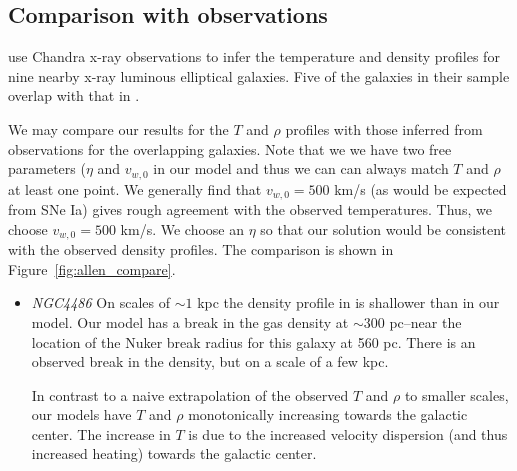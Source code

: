 \documentclass[usenatbib,fleqn]{mn2e}
\newcommand{\vwO}{v_{w,0}}
\begin{document}

\subsection{Comparison with observations}
\citealt{AllenDunn+:2006a} use Chandra x-ray observations to infer the
temperature and density profiles for nine nearby x-ray luminous
elliptical galaxies.  Five of the galaxies in their sample overlap
with that in .

We may compare our results for the $T$ and $\rho$ profiles with those
inferred from observations for the overlapping galaxies.  Note that we
we have two free parameters ($\eta$ and $\vwO$ in our model and thus
we can can always match $T$ and $\rho$ at least one point.  We
generally find that $\vwO=500$ km/s (as would be expected from SNe Ia)
gives rough agreement with the observed temperatures.  Thus, we choose
$\vwO=500$ km/s.  We choose an $\eta$ so that our solution would be
consistent with the observed density profiles. The comparison is shown
in Figure~\ref{fig:allen_compare}.


\begin{itemize}
\item \emph{NGC4486} %
  On scales of $\sim1$ kpc the density profile in
  \citealt{AllenDunn+:2006a} is shallower than in our model. Our model
  has a break in the gas density at $\sim 300$ pc--near the location
  of the Nuker break radius for this galaxy at 560 pc. There is an
  observed break in the density, but on a scale of a few kpc.

  In contrast to a naive extrapolation of the observed $T$ and $\rho$
  to smaller scales, our models have $T$ and $\rho$ monotonically
  increasing towards the galactic center. The increase in $T$ is due
  to the increased velocity dispersion (and thus increased heating)
  towards the galactic center.
\end{itemize}
\end{document}
